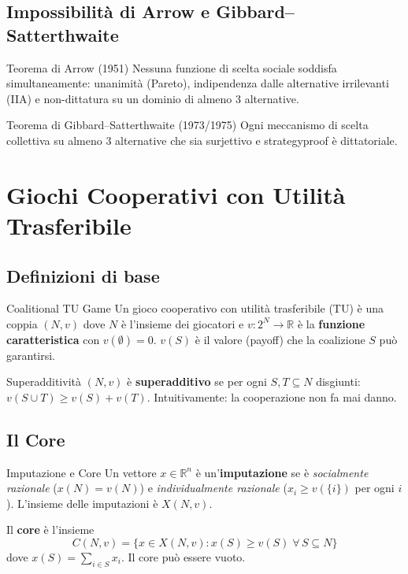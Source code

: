 \documentclass[12pt,a4paper,twoside]{book}
\theoremstyle{plain}
\theoremstyle{definition}
\begin{document}
\section{Impossibilità di Arrow e Gibbard--Satterthwaite}

\begin{thmbox}{Teorema di Arrow (1951)}
Nessuna funzione di scelta sociale soddisfa simultaneamente: unanimità (Pareto), indipendenza dalle alternative irrilevanti (IIA) e non-dittatura su un dominio di almeno 3 alternative.
\end{thmbox}

\begin{thmbox}{Teorema di Gibbard--Satterthwaite (1973/1975)}
Ogni meccanismo di scelta collettiva su almeno 3 alternative che sia surjettivo e strategyproof è dittatoriale.
\end{thmbox}

\chapter{Giochi Cooperativi con Utilità Trasferibile}
\label{app:cooperative}

\section{Definizioni di base}

\begin{defbox}{Coalitional TU Game}
Un gioco cooperativo con utilità trasferibile (TU) è una coppia $(N,v)$ dove $N$ è l'insieme dei giocatori e $v:2^N\to\mathbb{R}$ è la \textbf{funzione caratteristica} con $v(\emptyset)=0$. $v(S)$ è il valore (payoff) che la coalizione $S$ può garantirsi.
\end{defbox}

\begin{defbox}{Superadditività}
$(N,v)$ è \textbf{superadditivo} se per ogni $S,T\subseteq N$ disgiunti: $v(S\cup T)\ge v(S)+v(T)$. Intuitivamente: la cooperazione non fa mai danno.
\end{defbox}

\section{Il Core}

\begin{defbox}{Imputazione e Core}
Un vettore $x\in\mathbb{R}^n$ è un'\textbf{imputazione} se è \emph{socialmente razionale} ($x(N)=v(N)$) e \emph{individualmente razionale} ($x_i\ge v(\{i\})$ per ogni $i$). L'insieme delle imputazioni è $X(N,v)$.

Il \textbf{core} è l'insieme
\[
  C(N,v) = \{x\in X(N,v) : x(S)\ge v(S)\;\forall\,S\subseteq N\}
\]
dove $x(S)=\sum_{i\in S}x_i$. Il core può essere vuoto.
\end{defbox}
\end{document}

